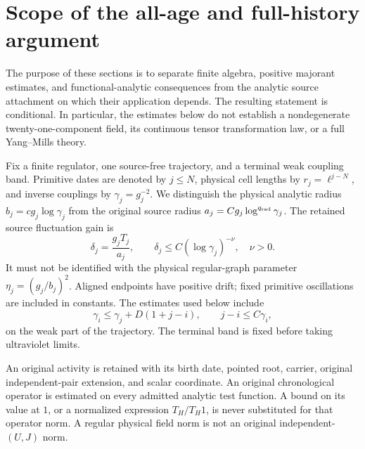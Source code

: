 
\section{Scope of the all-age and full-history argument}
\label{ha:scope}

The purpose of these sections is to separate finite algebra, positive
majorant estimates, and functional-analytic consequences from the analytic
source attachment on which their application depends.  The resulting
statement is conditional.  In particular, the estimates below do not
establish a nondegenerate twenty-one-component field, its continuous tensor
transformation law, or a full Yang--Mills theory.

Fix a finite regulator, one source-free trajectory, and a terminal weak
coupling band.  Primitive dates are denoted by $j\leq N$, physical cell
lengths by $r_j=\ell^{j-N}$, and inverse couplings by
$\gamma_j=g_j^{-2}$.  We distinguish the physical analytic radius
$b_j=cg_j\log\gamma_j$ from the original source radius
$a_j=Cg_j\log^{q_{\rm rad}}\gamma_j$.  The retained source fluctuation
gain is
\begin{equation}
 \delta_j=\frac{g_jT_j}{a_j},\qquad
 \delta_j\leq C(\log\gamma_j)^{-\nu},\quad \nu>0.
 \label{ha:delta}
\end{equation}
It must not be identified with the physical regular-graph parameter
$\eta_j=(g_j/b_j)^2$.  Aligned endpoints have positive drift; fixed
primitive oscillations are included in constants.  The estimates used
below include
\begin{equation}
 \gamma_i\leq\gamma_j+D(1+j-i),\qquad
 j-i\leq C\gamma_i,
 \label{ha:drift}
\end{equation}
on the weak part of the trajectory.  The terminal band is fixed before
taking ultraviolet limits.

An original activity is retained with its birth date, pointed root,
carrier, original independent-pair extension, and scalar coordinate.
An original chronological operator is estimated on every admitted analytic
test function.  A bound on its value at $1$, or a normalized expression
$T_H/T_H1$, is never substituted for that operator norm.  A regular
physical field norm is not an original independent-$(U,J)$ norm.

